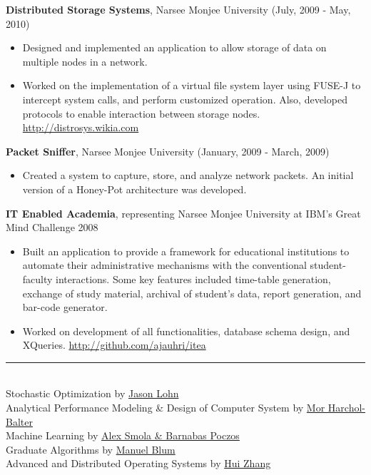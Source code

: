 \documentclass[a4paper,oneside,english]{article}
\begin{document}
\noindent\textbf{Distributed Storage Systems}, Narsee Monjee University (July, 2009 - May, 2010)
\begin{itemize}
	\itemsep0em
	\item Designed and implemented an application to allow storage of data on multiple nodes in a network. 
	\item Worked on the implementation of a virtual file system layer using FUSE-J to intercept system calls, and perform customized operation. Also, developed protocols to enable interaction between storage nodes. \url{http://distrosys.wikia.com}
\end{itemize} \vspace*{2mm}
\noindent\textbf{Packet Sniffer}, Narsee Monjee University (January, 2009 - March, 2009)
\begin{itemize}
	\itemsep0em
	\item Created a system to capture, store, and analyze network packets. An initial version of a Honey-Pot architecture was developed.
\end{itemize} \vspace*{2mm}
\noindent\textbf{IT Enabled Academia}, representing Narsee Monjee University at IBM's Great Mind Challenge 2008
\begin{itemize}
	\itemsep0em
	\item Built an application to provide a framework for educational institutions to automate their administrative mechanisms with the conventional student-faculty interactions. Some key features included time-table generation, exchange of study material, archival of student’s data, report generation, and bar-code generator.
	\item Worked on development of all functionalities, database schema design, and XQueries. \url{http://github.com/ajauhri/itea}
\end{itemize}
\noindent\rule{6in}{0.4pt} \\[4pt]
Stochastic Optimization by \href{https://www.cmu.edu/silicon-valley/faculty-staff/lohn-jason.html}{\UrlFont Jason Lohn} \vspace*{2mm} \\  
Analytical Performance Modeling \& Design of Computer System by \href{https://www.cs.cmu.edu/~harchol/Perfclass/class12fall.html}{\UrlFont Mor Harchol-Balter}  \vspace*{2mm} \\
Machine Learning by \href{http://alex.smola.org/teaching/cmu2013-10-701/}{\UrlFont Alex Smola \& Barnabas Poczos}  \vspace*{2mm} \\
Graduate Algorithms by \href{https://www.cs.cmu.edu/~mblum/}{\UrlFont Manuel Blum}  \vspace*{2mm} \\
Advanced and Distributed Operating Systems by \href{https://www.cs.cmu.edu/~15712/}{\UrlFont Hui Zhang}
\end{document}

